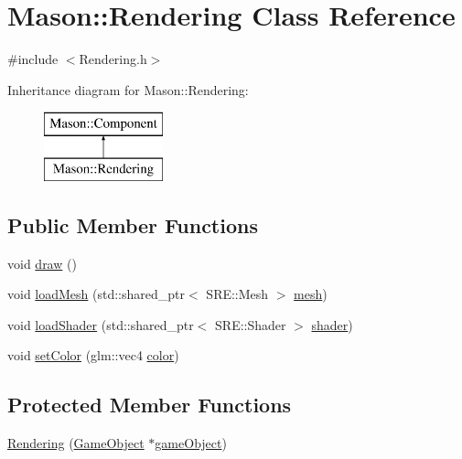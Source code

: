 \hypertarget{class_mason_1_1_rendering}{}\section{Mason\+:\+:Rendering Class Reference}
\label{class_mason_1_1_rendering}


{\ttfamily \#include $<$Rendering.\+h$>$}

Inheritance diagram for Mason\+:\+:Rendering\+:\begin{figure}[H]
\begin{center}
\leavevmode
\includegraphics[height=2.000000cm]{class_mason_1_1_rendering}
\end{center}
\end{figure}
\subsection*{Public Member Functions}
\begin{DoxyCompactItemize}
\item 
void \hyperlink{class_mason_1_1_rendering_a6d279efe1ba558f425ab6bbdfa29ab48}{draw} ()
\item 
void \hyperlink{class_mason_1_1_rendering_ad27f8dd05e607f8503e0a102fa89d523}{load\+Mesh} (std\+::shared\+\_\+ptr$<$ S\+R\+E\+::\+Mesh $>$ \hyperlink{class_mason_1_1_rendering_a71855a0cbc812640516a7925be451546}{mesh})
\item 
void \hyperlink{class_mason_1_1_rendering_a3ba4b1664ba76794b6efa266fdceab6c}{load\+Shader} (std\+::shared\+\_\+ptr$<$ S\+R\+E\+::\+Shader $>$ \hyperlink{class_mason_1_1_rendering_a32477a9cf3115210280e47e9172ca407}{shader})
\item 
void \hyperlink{class_mason_1_1_rendering_aa8a7db1f0f25ac88cc6584a2a5b814ed}{set\+Color} (glm\+::vec4 \hyperlink{class_mason_1_1_rendering_a5a78c6260d5111659f1e96888a55bda1}{color})
\end{DoxyCompactItemize}
\subsection*{Protected Member Functions}
\begin{DoxyCompactItemize}
\item 
\hyperlink{class_mason_1_1_rendering_abb768ec53a7193e20f8a35d325c0a991}{Rendering} (\hyperlink{class_mason_1_1_game_object}{Game\+Object} $\ast$\hyperlink{class_mason_1_1_component_a30030370c35f5562cbbbb0927b0448c8}{game\+Object})
\end{DoxyCompactItemize}
